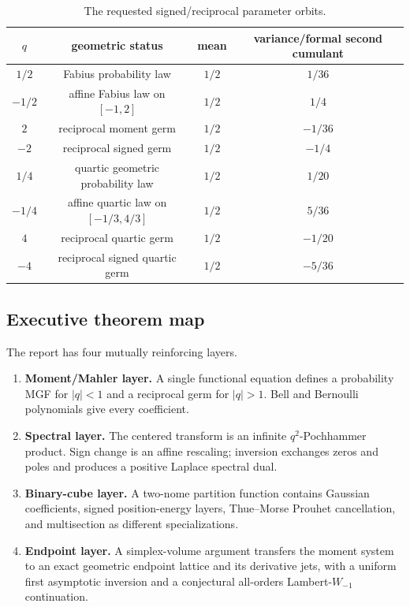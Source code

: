 \documentclass[11pt,oneside]{article}
\numberwithin{equation}{section}
\theoremstyle{definition}
\theoremstyle{remark}
\begin{document}
\begin{table}[H]
\centering
\caption{The requested signed/reciprocal parameter orbits.}
\label{tab:orbit-variance}
\begin{tabular}{c c c c}
\toprule
$q$ & geometric status & mean & variance/formal second cumulant \\
\midrule
$1/2$ & Fabius probability law & $1/2$ & $1/36$ \\
$-1/2$ & affine Fabius law on $[-1,2]$ & $1/2$ & $1/4$ \\
$2$ & reciprocal moment germ & $1/2$ & $-1/36$ \\
$-2$ & reciprocal signed germ & $1/2$ & $-1/4$ \\
\addlinespace
$1/4$ & quartic geometric probability law & $1/2$ & $1/20$ \\
$-1/4$ & affine quartic law on $[-1/3,4/3]$ & $1/2$ & $5/36$ \\
$4$ & reciprocal quartic germ & $1/2$ & $-1/20$ \\
$-4$ & reciprocal signed quartic germ & $1/2$ & $-5/36$ \\
\bottomrule
\end{tabular}
\end{table}

\subsection{Executive theorem map}

The report has four mutually reinforcing layers.
\begin{enumerate}
\item \textbf{Moment/Mahler layer.}  A single functional equation defines a
      probability MGF for $|q|<1$ and a reciprocal germ for $|q|>1$.  Bell and
      Bernoulli polynomials give every coefficient.
\item \textbf{Spectral layer.}  The centered transform is an infinite
      $q^2$-Pochhammer product.  Sign change is an affine rescaling; inversion
      exchanges zeros and poles and produces a positive Laplace spectral dual.
\item \textbf{Binary-cube layer.}  A two-nome partition function contains
      Gaussian coefficients, signed position-energy layers, Thue--Morse
      Prouhet cancellation, and multisection as different specializations.
\item \textbf{Endpoint layer.}  A simplex-volume argument transfers the
      moment system to an exact geometric endpoint lattice and its derivative
      jets, with a uniform first asymptotic inversion and a conjectural
      all-orders Lambert-$W_{-1}$ continuation.
\end{enumerate}
\end{document}
